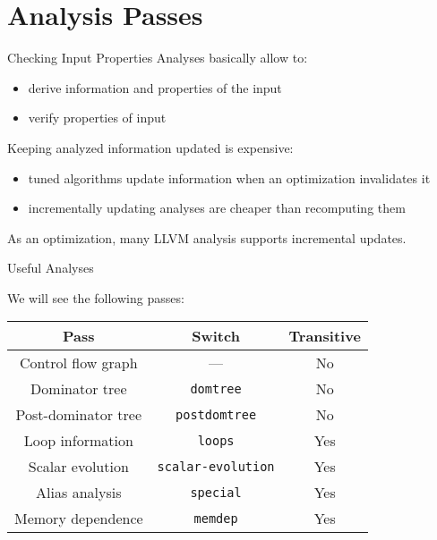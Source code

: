 
\section{Analysis Passes}


\begin{frame}{Checking Input Properties}
Analyses basically allow to:
\begin{itemize}
\item \alert{derive} information and properties of the input
\item \alert{verify} properties of input
\end{itemize}

\vfill
Keeping analyzed information updated is expensive:
\begin{itemize}
\item tuned algorithms update information when an optimization
      invalidates it
\item incrementally updating analyses are cheaper than recomputing them
\end{itemize}

\vfill
As an \alert{optimization}, many LLVM analysis supports incremental updates.
\end{frame}


\begin{frame}{Useful Analyses}
\begin{center}
We will see the following passes:\\
\bigskip
\begin{tabular}{ccc}
\toprule

\multicolumn{1}{c}{\textbf{Pass}}        &
\multicolumn{1}{c}{\textbf{Switch}}      &
\multicolumn{1}{c}{\textbf{Transitive}} \\

\midrule

Control flow graph  &
---       &
No                 \\

Dominator tree    &
\texttt{domtree}  &
No               \\

Post-dominator tree   &
\texttt{postdomtree}  &
No                   \\

Loop information  &
\texttt{loops}    &
Yes              \\

Scalar evolution           &
\texttt{scalar-evolution}  &
Yes                       \\

Alias analysis    &
\texttt{special}  &
Yes              \\

Memory dependence  &
\texttt{memdep}    &
Yes               \\

\bottomrule
\end{tabular}
\end{center}
\end{frame}


